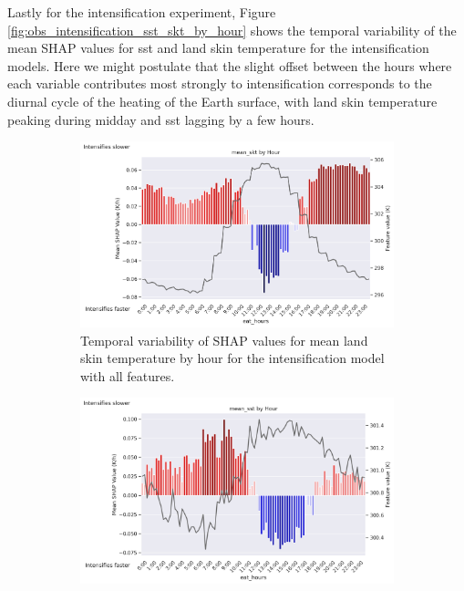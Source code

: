 Lastly for the intensification experiment, Figure \ref{fig:obs_intensification_sst_skt_by_hour} shows the temporal variability of the mean SHAP values for \acrfull{sst} and land skin temperature for the intensification models. Here we might postulate that the slight offset between the hours where each variable contributes most strongly to intensification corresponds to the diurnal cycle of the heating of the Earth surface, with land skin temperature peaking during midday and \acrshort{sst} lagging by a few hours.

\begin{figure}[ht]
    \centering
    \begin{subfigure}[t]{\textwidth}
        \centering
        \includegraphics[width=\textwidth]{../figures/generated/experiments/obs_intensification/temporal_corr/obs_intensification_all_shap_mean_skt_by_hour.png}
        \caption{Temporal variability of SHAP values for mean land skin temperature by hour for the intensification model with all features.}
        \label{fig:obs_intensification_all_shap_mean_skt_by_hour}
    \end{subfigure}
    \vspace{1em}
    \begin{subfigure}[t]{\textwidth}
        \centering
        \includegraphics[width=\textwidth]{../figures/generated/experiments/obs_intensification/temporal_corr/obs_intensification_era5_shap_mean_sst_by_hour.png}

\end{subfigure}
\end{figure}
